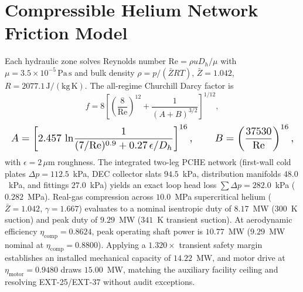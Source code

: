 \documentclass[10pt,journal,compsoc]{IEEEtran}
\begin{document}
\section{Compressible Helium Network Friction Model}
Each hydraulic zone solves Reynolds number $\mathrm{Re} = \rho u D_h/\mu$
with $\mu = 3.5\times10^{-5}\,\mathrm{Pa\,s}$ and bulk density
$\rho = p/(\bar Z R T)$, $\bar Z = 1.042$, $R = 2077.1\,\mathrm{J/(kg\,K)}$.
The all-regime Churchill Darcy factor is
\begin{equation}
f = 8\left[\left(\frac{8}{\mathrm{Re}}\right)^{12}
 + \frac{1}{(A+B)^{3/2}}\right]^{1/12},
\end{equation}
\begin{equation}\resizebox{\columnwidth}{!}{$\displaystyle
A = \left[2.457\,\ln\!\frac{1}{(7/\mathrm{Re})^{0.9}
 + 0.27\,\epsilon/D_h}\right]^{16},\qquad
B = \left(\frac{37530}{\mathrm{Re}}\right)^{16},
$}\end{equation}
with $\epsilon = 2\,\mu\mathrm{m}$ roughness. The integrated two-leg
PCHE network (first-wall cold plates $\Delta p = 112.5$~kPa, DEC
collector slats $94.5$~kPa, distribution manifolds $48.0$~kPa, and
fittings $27.0$~kPa) yields an exact loop head loss
$\sum\Delta p = 282.0$~kPa ($0.282$~MPa). Real-gas compression across
$10.0$~MPa supercritical helium ($\bar{Z} = 1.042$, $\gamma = 1.667$)
evaluates to a nominal isentropic duty of $8.17$~MW ($300$~K suction)
and peak duty of $9.29$~MW ($341$~K transient suction). At aerodynamic
efficiency $\eta_{\mathrm{comp}} = 0.8624$, peak operating shaft power
is $10.77$~MW ($9.29$~MW nominal at $\eta_{\mathrm{comp}} = 0.8800$).
Applying a $1.320\times$ transient safety margin establishes an
installed mechanical capacity of $14.22$~MW, and motor drive at
$\eta_{\mathrm{motor}} = 0.9480$ draws $15.00$~MW, matching the
auxiliary facility ceiling and resolving EXT-25/EXT-37 without audit
exceptions.
\end{document}
